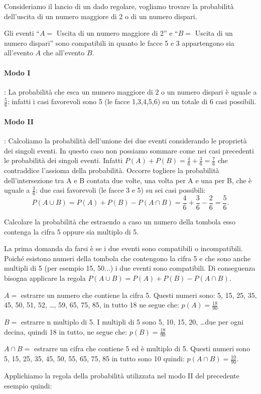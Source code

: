 \begin{exrig}
\begin{esempio}
Consideriamo il lancio di un dado regolare, vogliamo trovare la probabilità 
dell'uscita di un numero maggiore di 2 o di un numero dispari.

Gli eventi ``$ A= $ Uscita di un numero maggiore di 2'' e ``$ B= $ Uscita di un 
numero dispari'' sono compatibili in quanto le facce 5 e 3 appartengono sia 
all'evento $A$ che all'evento $B$.
\begin{center}
 
\end{center}
\paragraph{Modo I}: La probabilità che esca un numero maggiore di $2$ o un 
numero dispari è uguale a $\frac 5 6$: infatti i casi favorevoli sono 5 (le 
facce 1,3,4,5,6) su un totale di $6$ casi possibili.
\paragraph{Modo II}: Calcoliamo la probabilità dell'unione dei due eventi 
considerando le proprietà dei singoli eventi. In questo caso non possiamo 
sommare come nei casi precedenti le probabilità dei singoli eventi. Infatti 
$P(A)+P(B)=\frac 4 6+\frac 3 6=\frac 7 6$ che contraddice l'assioma della 
probabilità. Occorre togliere la probabilità dell'intersezione tra A e B contata 
due volte, una volta per A e una per B, che è uguale a $\frac 2 6$: due casi 
favorevoli (le facce 3 e 5) su sei casi possibili: \[P(A\cup 
B)=P(A)+P(B)-P(A\cap B)=\frac 4 6+\frac 3 6-\frac 2 6=\frac 5 6.\]
\end{esempio}

\begin{esempio}
Calcolare la probabilità che estraendo a caso un numero della tombola esso 
contenga la cifra 5 oppure sia multiplo di 5.

La prima domanda da farsi è se i due eventi sono compatibili o incompatibili. 
Poiché esistono numeri della tombola che contengono la cifra 5 e che sono anche 
multipli di 5 (per esempio 15, 50...) i due eventi sono compatibili. Di 
conseguenza bisogna applicare la regola $P(A\cup B)=P(A)+P(B)-P(A\cap B)$.
\begin{itemize*}
\item $ A = $ estrarre un numero che contiene la cifra 5. Questi numeri sono: 5, 
15, 25, 35, 45, 50, 51, 52, \dots, 59, 65, 75, 85, in tutto 18 ne segue che: 
$p(A)=\frac{18}{90}$
\item $ B = $ estrarre n multiplo di 5. I multipli di 5 sono 5, 10, 15, 20, 
\dots due per ogni decina, quindi 18 in tutto, ne segue che: 
$p(B)=\frac{18}{90}$
\item $A\cap B =$ estrarre un cifra che contiene 5 ed è multiplo di 5. Questi 
numeri sono 5, 15, 25, 35, 45, 50, 55, 65, 75, 85 in tutto sono 10 quindi: 
$p(A\cap B)=\frac{10}{90}$.
\end{itemize*}
Applichiamo la regola della probabilità utilizzata nel modo II del precedente 
esempio quindi:


\end{esempio}
\end{exrig}
